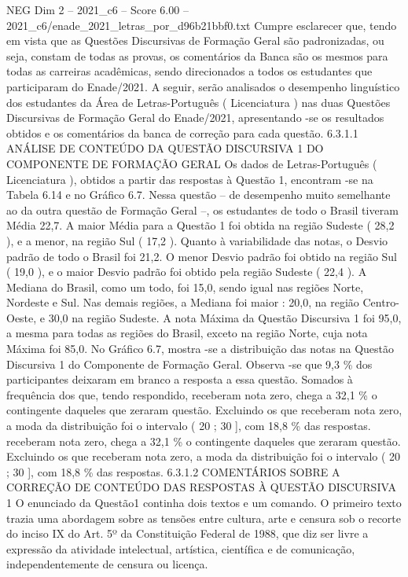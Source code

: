 \begin{textsample}{NEG Dim 2 – 2021\_c6 – Score 6.00 – 2021\_c6/enade\_2021\_letras\_por\_d96b21bbf0.txt}
Cumpre esclarecer que, tendo em vista que as Questões Discursivas de Formação Geral são padronizadas, ou seja, constam de todas as provas, os comentários da Banca são os mesmos para todas as carreiras acadêmicas, sendo direcionados a todos os estudantes que participaram do Enade/2021.
A seguir, serão analisados o desempenho linguístico dos estudantes da Área de Letras-Português ( Licenciatura ) nas duas Questões Discursivas de Formação Geral do Enade/2021, apresentando -se os resultados obtidos e os comentários da banca de correção para cada questão. 6.3.1.1 ANÁLISE DE CONTEÚDO DA QUESTÃO DISCURSIVA 1 DO COMPONENTE DE FORMAÇÃO GERAL Os dados de Letras-Português ( Licenciatura ), obtidos a partir das respostas à Questão 1, encontram -se na Tabela 6.14 e no Gráfico 6.7.
Nessa questão – de desempenho muito semelhante ao da outra questão de Formação Geral –, os estudantes de todo o Brasil tiveram Média 22,7.
A maior Média para a Questão 1 foi obtida na região Sudeste ( 28,2 ), e a menor, na região Sul ( 17,2 ).
Quanto à variabilidade das notas, o Desvio padrão de todo o Brasil foi 21,2.
O menor Desvio padrão foi obtido na região Sul ( 19,0 ), e o maior Desvio padrão foi obtido pela região Sudeste ( 22,4 ).
A Mediana do Brasil, como um todo, foi 15,0, sendo igual nas regiões Norte, Nordeste e Sul.
Nas demais regiões, a Mediana foi maior : 20,0, na região Centro-Oeste, e 30,0 na região Sudeste.
A nota Máxima da Questão Discursiva 1 foi 95,0, a mesma para todas as regiões do Brasil, exceto na região Norte, cuja nota Máxima foi 85,0.
No Gráfico 6.7, mostra -se a distribuição das notas na Questão Discursiva 1 do Componente de Formação Geral.
Observa -se que 9,3 \% dos participantes deixaram em branco a resposta a essa questão.
Somados à frequência dos que, tendo respondido, receberam nota zero, chega a 32,1 \% o contingente daqueles que zeraram questão.
Excluindo os que receberam nota zero, a moda da distribuição foi o intervalo ( 20 ; 30 ], com 18,8 \% das respostas. receberam nota zero, chega a 32,1 \% o contingente daqueles que zeraram questão.
Excluindo os que receberam nota zero, a moda da distribuição foi o intervalo ( 20 ; 30 ], com 18,8 \% das respostas. 6.3.1.2 COMENTÁRIOS SOBRE A CORREÇÃO DE CONTEÚDO DAS RESPOSTAS À QUESTÃO DISCURSIVA 1 O enunciado da Questão1 continha dois textos e um comando.
O primeiro texto trazia uma abordagem sobre as tensões entre cultura, arte e censura sob o recorte do inciso IX do Art. 5º da Constituição Federal de 1988, que diz ser livre a expressão da atividade intelectual, artística, científica e de comunicação, independentemente de censura ou licença.

\end{textsample}
